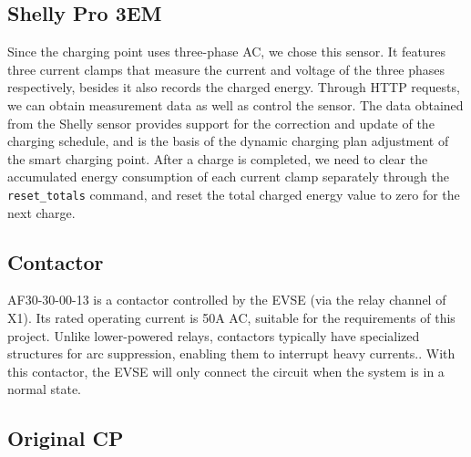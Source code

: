\documentclass[
english,
ruledheaders=section,%
class=report,%
thesis={type=Report},%
accentcolor=9c,%
custommargins=true,%
marginpar=false,%
parskip=half-,%
fontsize=11pt,%
logofile={img/tuda_logo.pdf}, %
]{tudapub}
\begin{document}
    \subsection{Shelly Pro 3EM}
    \label{subsec:Shelly Pro 3EM}

    Since the charging point uses three-phase AC, we chose this sensor. It features three current clamps that measure the current and voltage of the three phases respectively, besides it also records the charged energy. Through HTTP requests, we can obtain measurement data as well as control the sensor. The data obtained from the Shelly sensor provides support for the correction and update of the charging schedule, and is the basis of the dynamic charging plan adjustment of the smart charging point. After a charge is completed, we need to clear the accumulated energy consumption of each current clamp separately through the \texttt{reset\_totals} command, and reset the total charged energy value to zero for the next charge.
    \subsection{Contactor}
    \label{subsec:Contactor}

    AF30-30-00-13 is a contactor controlled by the EVSE (via the relay channel of X1). Its rated operating current is 50A AC\cite{AF30-30-00-13}, suitable for the requirements of this project. Unlike lower-powered relays, contactors typically have specialized structures for arc suppression, enabling them to interrupt heavy currents.\cite{Contactor}. With this contactor, the EVSE will only connect the circuit when the system is in a normal state.
    \subsection{Original CP}
    \label{subsec:Original CP}
\end{document}
